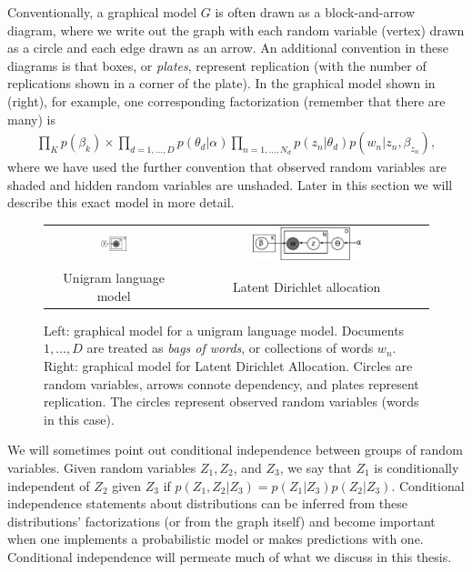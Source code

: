 Conventionally, a graphical model $G$ is often drawn as a
block-and-arrow diagram, where we write out the graph with each random
variable (vertex) drawn as a circle and each edge drawn as an
arrow.  An additional convention in these diagrams is that boxes, or
\emph{plates}, represent replication (with the number of replications
shown in a corner of the plate). In the graphical model shown in
 (right), for example, one corresponding
factorization (remember that there are many) is
\begin{align}
  \prod_K p(\beta_k) \times \prod_{d=1,\ldots,D} p(\theta_d | \alpha) \prod_{n=1,\ldots,N_d} p(z_n | \theta_d) p(w_n | z_n, \beta_{z_n}),
\end{align}
where we have used the further convention that observed random
variables are shaded and hidden random variables are unshaded.  Later
in this section we will describe this exact model in more detail.

\begin{figure}
  \begin{center}
    \begin{tabular}{cc}
      \includegraphics[width=0.2\textwidth]{chapter_introductory_material/figs/bagofwords_gm.pdf} & 
      \includegraphics[width=0.4667\textwidth]{chapter_introductory_material/figs/lda_gm.pdf} \\
      Unigram language model & Latent Dirichlet allocation \\
    \end{tabular}
  \end{center}
  \caption{Left: graphical model for a unigram language model.
    Documents $1, \ldots, D$ are treated as \emph{bags of words}, or
    collections of words $w_n$.  Right: graphical model for Latent
    Dirichlet Allocation.  Circles are random variables, arrows
    connote dependency, and plates represent replication.  The circles
    represent observed random variables (words in this case).}
  \label{fig:bagofwords_lda_gm}
\end{figure}

We will sometimes point out conditional independence between groups of
random variables.  Given random variables $Z_1, Z_2$, and $Z_3$, we
say that $Z_1$ is conditionally independent of $Z_2$ given $Z_3$ if
$p(Z_1, Z_2 | Z_3) = p(Z_1 | Z_3) p(Z_2 | Z_3)$.  Conditional
independence statements about distributions can be inferred from these
distributions' factorizations (or from the graph itself) and become
important when one implements a probabilistic model or makes
predictions with one. Conditional independence will permeate much of
what we discuss in this thesis.

